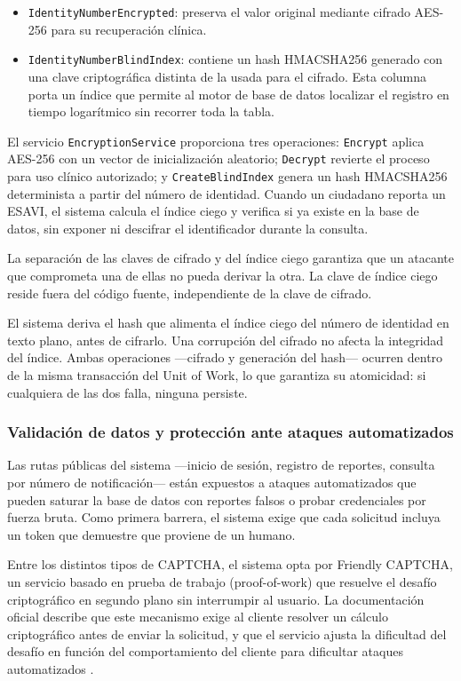 \begin{itemize}
    \item \texttt{IdentityNumberEncrypted}: preserva el valor original mediante cifrado AES-256 para su recuperación clínica.
    \item \texttt{IdentityNumberBlindIndex}: contiene un hash HMACSHA256 generado con una clave criptográfica distinta de la usada para el cifrado. 
Esta columna porta un índice que permite al motor de base de datos localizar el registro en tiempo logarítmico sin recorrer toda la tabla.
\end{itemize}

El servicio \texttt{EncryptionService} proporciona tres operaciones: \texttt{Encrypt} aplica AES-256 con un vector de inicialización aleatorio; \texttt{Decrypt} revierte el proceso para uso clínico autorizado; y \texttt{CreateBlindIndex} genera un hash HMACSHA256 determinista a partir del número de identidad. Cuando un ciudadano reporta un ESAVI, el sistema calcula el índice ciego y verifica si ya existe en la base de datos, sin exponer ni descifrar el identificador durante la consulta.

La separación de las claves de cifrado y del índice ciego garantiza que un atacante que comprometa una de ellas no pueda derivar la otra. 
La clave de índice ciego reside fuera del código fuente, independiente de la clave de cifrado.

El sistema deriva el hash que alimenta el índice ciego del número de identidad en texto plano, antes de cifrarlo. Una corrupción del cifrado no afecta la integridad del índice. Ambas operaciones —cifrado y generación del hash— ocurren dentro de la misma transacción del Unit of Work, lo que garantiza su atomicidad: si cualquiera de las dos falla, ninguna persiste.

\subsubsection{Validación de datos y protección ante ataques automatizados}

Las rutas públicas del sistema —inicio de sesión, registro de reportes, consulta por número de notificación— están expuestos a ataques automatizados que pueden saturar la base de datos con reportes falsos o probar credenciales por fuerza bruta. Como primera barrera, el sistema exige que cada solicitud incluya un token que demuestre que proviene de un humano.

Entre los distintos tipos de CAPTCHA, el sistema opta por Friendly CAPTCHA, un servicio basado en prueba de trabajo (proof-of-work) que resuelve el desafío criptográfico en segundo plano sin interrumpir al usuario. La documentación oficial describe que este mecanismo exige al cliente resolver un cálculo criptográfico antes de enviar la solicitud, y que el servicio ajusta la dificultad del desafío en función del comportamiento del cliente para dificultar ataques automatizados \cite{friendlycaptcha}. 

